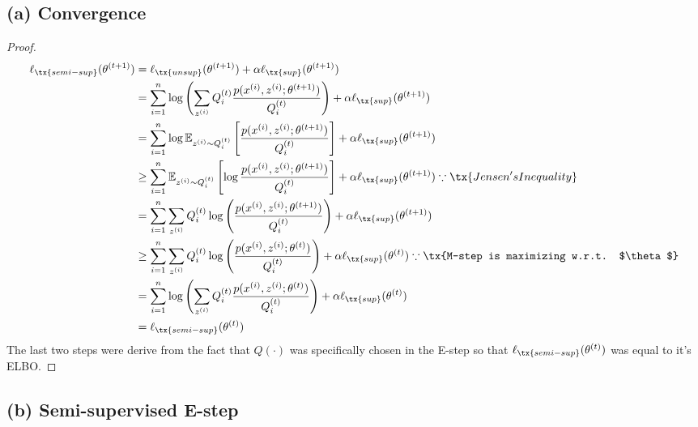 \documentclass[11pt]{article}
\newcommand{\upi}[0]{^{(i)}}
\begin{document}
	\subsection{(a) Convergence}
	\begin{proof}
		\begin{align}
			\ell_{\tx{semi-sup}}(\theta^{(t+1)}) &= \ell_{\tx{unsup}}(\theta^{(t+1)}) + \alpha \ell_{\tx{sup}}(\theta^{(t+1)}) \\
			&= \sum_{i=1}^n \log \left(
			\sum_{z\upi} Q^{(t)}_i \frac{p(x\upi, z\upi; \theta^{(t+1)})}{Q^{(t)}_i}
			\right) + \alpha \ell_{\tx{sup}}(\theta^{(t+1)}) \\
			&= \sum_{i=1}^n \log \mathbb{E}_{z\upi \sim Q^{(t)}_i} \left[\frac{p(x\upi, z\upi; \theta^{(t+1)})}{Q^{(t)}_i}\right] + \alpha \ell_{\tx{sup}}(\theta^{(t+1)}) \\
			&\geq \sum_{i=1}^n \mathbb{E}_{z\upi \sim Q^{(t)}_i} \left[\log \frac{p(x\upi, z\upi; \theta^{(t+1)})}{Q^{(t)}_i}\right] + \alpha \ell_{\tx{sup}}(\theta^{(t+1)}) \because \tx{Jensen's Inequality} \\
			&= \sum_{i=1}^n \sum_{z\upi} Q^{(t)}_i \log \left( \frac{p(x\upi, z\upi; \theta^{(t+1)})}{Q^{(t)}_i}\right ) + \alpha \ell_{\tx{sup}}(\theta^{(t+1)}) \\
			&\geq \sum_{i=1}^n \sum_{z\upi} Q^{(t)}_i \log \left( \frac{p(x\upi, z\upi; \theta^{(t)})}{Q^{(t)}_i}\right ) + \alpha \ell_{\tx{sup}}(\theta^{(t)}) \because \tx{M-step is maximizing w.r.t. $\theta$} \\
			&= \sum_{i=1}^n \log \left( \sum_{z\upi} Q^{(t)}_i \frac{p(x\upi, z\upi; \theta^{(t)})}{Q^{(t)}_i}\right ) + \alpha \ell_{\tx{sup}}(\theta^{(t)}) \\
			&= \ell_{\tx{semi-sup}}(\theta^{(t)})
		\end{align}
		The last two steps were derive from the fact that $Q(\cdot)$ was specifically chosen in the E-step so that $\ell_{\tx{semi-sup}}(\theta^{(t)})$ was equal to it's ELBO.
	\end{proof}
	
	\newpage
	\subsection{(b) Semi-supervised E-step}
\end{document}

